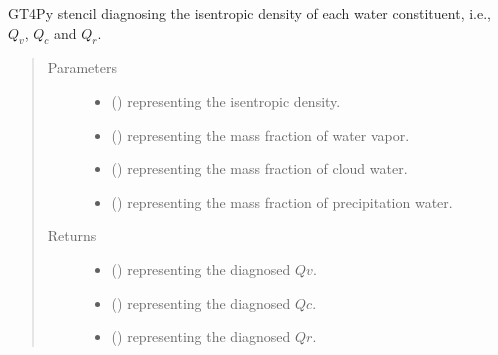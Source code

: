 \documentclass[letterpaper,10pt,english]{sphinxmanual}
\begin{document}
\begin{fulllineitems}
\begin{fulllineitems}
\label{\detokenize{api:dycore.diagnostic_isentropic.DiagnosticIsentropic._stencil_diagnosing_water_constituents_isentropic_density_defs}}
GT4Py stencil diagnosing the isentropic density of each water constituent, i.e.,
\(Q_v\), \(Q_c\) and \(Q_r\).
\begin{quote}\begin{description}
\item[{Parameters}] \leavevmode\begin{itemize}
\item {} 
 () \textendash{}  representing the isentropic density.

\item {} 
 () \textendash{}  representing the mass fraction of water vapor.

\item {} 
 () \textendash{}  representing the mass fraction of cloud water.

\item {} 
 () \textendash{}  representing the mass fraction of precipitation water.

\end{itemize}

\item[{Returns}] \leavevmode
\begin{itemize}
\item {} 
 () \textendash{}  representing the diagnosed \(Qv\).

\item {} 
 () \textendash{}  representing the diagnosed \(Qc\).

\item {} 
 () \textendash{}  representing the diagnosed \(Qr\).


\end{itemize}
\end{description}
\end{quote}
\end{fulllineitems}
\end{fulllineitems}
\end{document}
